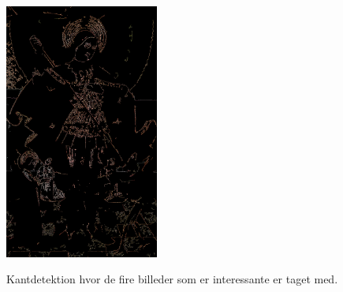 \begin{figure}[!h]
{        \includegraphics[angle=0,width=0.45\textwidth]{afsnit/afprovning/billeder/thressholds/krafitige_farver/krafite_detalier/2_iteration/300-800.png}
        \label{300-800}}\hspace{1em}
        \caption[]{Kantdetektion hvor de fire billeder som er
		interessante er taget med.}
     \label{allesammen3}
\end{figure}
 
